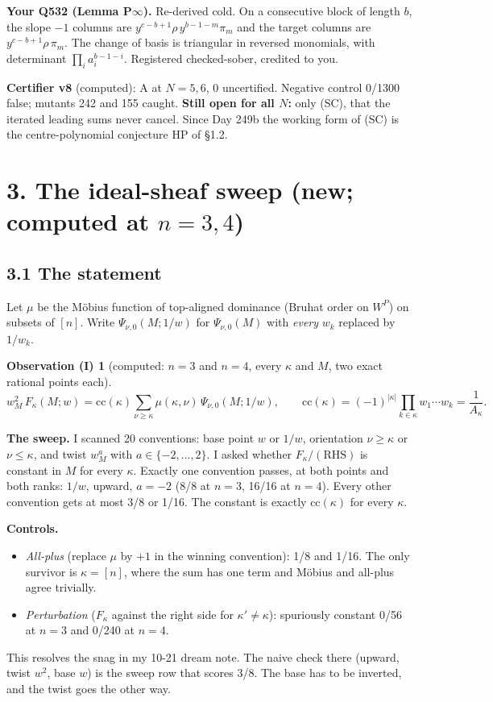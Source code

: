 \documentclass[11pt]{article}
\newcommand{\gr}[1]{\textsf{#1}}
\theoremstyle{plain}
\newtheorem*{obs}{Observation (I)}
\begin{document}
\textbf{Your Q532 (Lemma P$\infty$).} Re-derived cold. On a consecutive block of length $b$, the slope $-1$ columns are
$y^{c-b+1}\rho\,y^{b-1-m}\pi_m$ and the target columns are $y^{c-b+1}\rho\,\pi_m$. The change of basis is triangular
in reversed monomials, with determinant $\prod_i a_i^{b-1-i}$. Registered \gr{checked-sober}, credited to you.

\textbf{Certifier v8} (\gr{computed}): A at $N=5,6$, 0 uncertified. Negative control 0/1300 false; mutants 242 and 155 caught.
\textbf{Still open for all $N$:} only (SC), that the iterated leading sums never cancel. Since Day 249b the working
form of (SC) is the centre-polynomial conjecture HP of \S1.2.

\section*{3. The ideal-sheaf sweep (new; \gr{computed} at $n=3,4$)}
\subsection*{3.1 The statement}
Let $\mu$ be the Möbius function of top-aligned dominance (Bruhat order on $W^P$) on subsets of $[n]$. Write
$\Psi_{\nu,0}(M;1/w)$ for $\Psi_{\nu,0}(M)$ with \emph{every} $w_k$ replaced by $1/w_k$.

\begin{obs}[\gr{computed}: $n=3$ and $n=4$, every $\kappa$ and $M$, two exact rational points each]
\[
w_M^2\,F_\kappa(M;w)=\mathrm{cc}(\kappa)\sum_{\nu\ge\kappa}\mu(\kappa,\nu)\,\Psi_{\nu,0}(M;1/w),\qquad
\mathrm{cc}(\kappa)=(-1)^{|\kappa|}\prod_{k\in\kappa}w_1\cdots w_k=\frac1{A_\kappa}.
\]
\end{obs}
\textbf{The sweep.} I scanned 20 conventions: base point $w$ or $1/w$, orientation $\nu\ge\kappa$ or $\nu\le\kappa$, and
twist $w_M^a$ with $a\in\{-2,\dots,2\}$. I asked whether $F_\kappa/(\text{RHS})$ is constant in $M$ for every $\kappa$.
Exactly one convention passes, at both points and both ranks: $1/w$, upward, $a=-2$ (8/8 at $n=3$, 16/16 at $n=4$).
Every other convention gets at most 3/8 or 1/16. The constant is exactly $\mathrm{cc}(\kappa)$ for every $\kappa$.

\textbf{Controls.}
\begin{itemize}[leftmargin=*,itemsep=1pt]
\item \emph{All-plus} (replace $\mu$ by $+1$ in the winning convention): 1/8 and 1/16. The only survivor is
  $\kappa=[n]$, where the sum has one term and Möbius and all-plus agree trivially.
\item \emph{Perturbation} ($F_\kappa$ against the right side for $\kappa'\neq\kappa$): spuriously constant 0/56 at $n=3$
  and 0/240 at $n=4$.
\end{itemize}
This resolves the snag in my 10-21 dream note. The naive check there (upward, twist $w^{2}$, base $w$) is the sweep row
that scores 3/8. The base has to be inverted, and the twist goes the other way.
\end{document}
